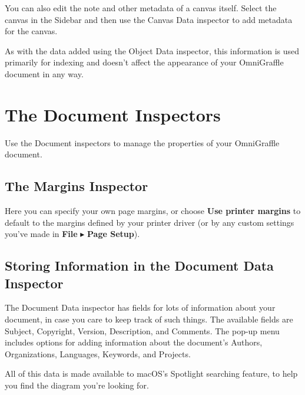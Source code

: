 \documentclass[../main.tex]{subfiles}
\begin{document}
  \begin{ogpro}
    You can also edit the note and other metadata of a canvas itself. Select the canvas in the
    Sidebar and then use the Canvas Data inspector to add metadata for the canvas.


    As with the data added using the Object Data inspector, this information is used primarily for
    indexing and doesn't affect the appearance of your OmniGraffle document in any way.
  \end{ogpro}

  \section{The Document Inspectors}

  Use the Document inspectors to manage the properties of your OmniGraffle document.

  \subsection{The Margins Inspector}

  Here you can specify your own page margins, or choose \textbf{Use printer margins} to default to
  the margins defined by your printer driver (or by any custom settings you've made in
  \textbf{File} $\blacktriangleright$ \textbf{Page Setup}).


  \subsection{Storing Information in the Document Data Inspector}

  The Document Data inspector has fields for lots of information about your document, in case you
  care to keep track of such things. The available fields are Subject, Copyright, Version,
  Description, and Comments. The pop-up menu includes options for adding information about the
  document's Authors, Organizations, Languages, Keywords, and Projects.


  All of this data is made available to macOS's Spotlight searching feature, to help you find the
  diagram you're looking for.
  
\end{document}
